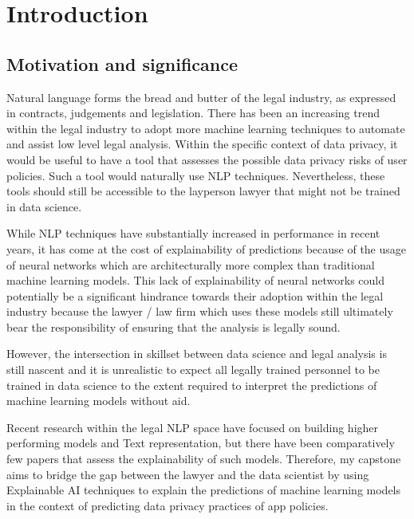 
\chapter{Introduction} %

\label{chapter1} %

\section{Motivation and significance}
Natural language forms the bread and butter of the legal industry, as expressed in contracts, judgements and legislation. There has been an increasing trend within the legal industry to adopt more machine learning techniques to automate and assist low level legal analysis. Within the specific context of data privacy, it would be useful to have a tool that assesses the possible data privacy risks of user policies. Such a tool would naturally use NLP techniques. Nevertheless, these tools should still be accessible to the layperson lawyer that might not be trained in data science.

While NLP techniques have substantially increased in performance in recent years, it has come at the cost of explainability of predictions because of the usage of neural networks which are architecturally more complex than traditional machine learning models. This lack of explainability of neural networks could potentially be a significant hindrance towards their adoption within the legal industry because the lawyer / law firm which uses these models still ultimately bear the responsibility of ensuring that the analysis is legally sound. 

However, the intersection in skillset between data science and legal analysis is still nascent and it is unrealistic to expect all legally trained personnel to be trained in data science to the extent required to interpret the predictions of machine learning models without aid.

Recent research within the legal NLP space have focused on building higher performing models and Text representation, but there have been comparatively few papers that assess the explainability of such models. Therefore, my capstone aims to bridge the gap between the lawyer and the data scientist by using Explainable AI techniques to explain the predictions of machine learning models in the context of predicting data privacy practices of app policies.

